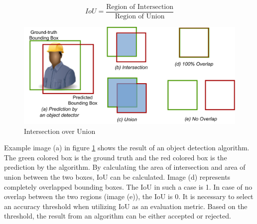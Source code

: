 \begin{equation}\label{eq:iou}
    IoU = \frac{\text{Region of Intersection}}{\text{Region of Union}}
\end{equation}

\begin{figure}[htb]
    \centering
    \includegraphics[width=1\linewidth]{97_graphics//related_work/iou.pdf}
    \caption{Intersection over Union}
    \label{fig:related_work-iou}
\end{figure}

Example image (a) in figure \ref{fig:related_work-iou} shows the result of an object detection algorithm. The green colored box is the ground truth and the red colored box is the prediction by the algorithm. By calculating the area of intersection and area of union between the two boxes, IoU can be calculated. Image (d) represents completely overlapped bounding boxes. The IoU in such a case is 1. In case of no overlap between the two regions  (image (e)), the IoU is 0. It is necessary to select an accuracy threshold when utilizing IoU as an evaluation metric. Based on the threshold, the result from an algorithm can be either accepted or rejected.
